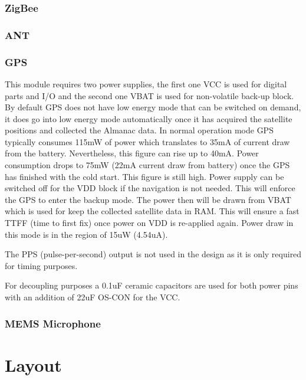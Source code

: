 \subsubsection*{ZigBee}
\TODO{}


\subsubsection*{ANT}
\TODO{}

\subsubsection*{GPS}
This module requires two power supplies, the first one VCC is used for digital parts and I/O and the second one VBAT is used for non-volatile back-up block. By default GPS does not have low energy mode that can be switched on demand, it does go into low energy mode automatically once it has acquired the satellite positions and collected the Almanac data. In normal operation mode GPS typically consumes 115mW of power which translates to 35mA of current draw from the battery. Nevertheless, this figure can rise up to 40mA. Power consumption drops to 75mW (22mA current draw from battery) once the GPS has finished with the cold start. This figure is still high. Power supply can be switched off for the VDD block if the navigation is not needed. This will enforce the GPS to enter the backup mode. The power then will be drawn from VBAT which is used for keep the collected satellite data in RAM. This will ensure a fast TTFF (time to first fix) once power on VDD is re-applied again. Power draw in this mode is in the region of 15uW (4.54uA).

The PPS (pulse-per-second) output is not used in the design as it is only required for timing purposes. 

For decoupling purposes a 0.1uF ceramic capacitors are used for both power pins with an addition of 22uF OS-CON for the VCC.

\subsubsection*{MEMS Microphone}
\TODO{}


\section{Layout}
\TODO{}


